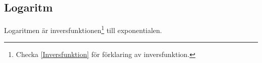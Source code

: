 \newpage
\subsection{Logaritm}

Logaritmen är inversfunktionen\footnote{Checka \ref{Inversfunktion} för förklaring av inversfunktion.} till exponentialen.




































































